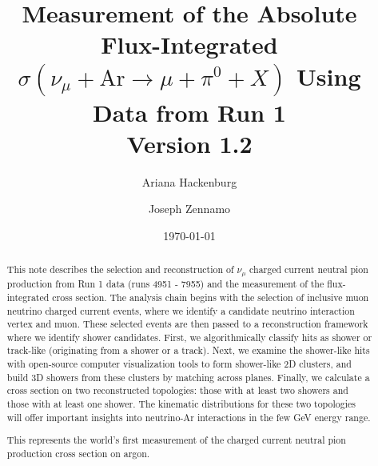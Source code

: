 \documentclass{article}
\title{\vspace{0.2in} Measurement of the Absolute Flux-Integrated $\sigma\left(\nu_{\mu}+\text{Ar} \rightarrow \mu + \pi^{0} + X\right)$ Using Data from Run 1 \\
{\bf Version 1.2}
}
\author[1]{Ariana Hackenburg}
\author[2]{Joseph Zennamo}
\affil[1]{Yale Univerity, New Haven, CT}
\affil[2]{University of Chicago, Chicago, IL}
\date{\today}
\begin{document}
\maketitle

\begin{abstract}
This note describes the selection and reconstruction of $\nu_{\mu}$ charged current neutral pion production from Run 1 data (runs 4951 - 7955) and the measurement of the flux-integrated cross section. The analysis chain begins with the selection of inclusive muon neutrino charged current events, where we identify a candidate neutrino interaction vertex and muon. These selected events are then passed to a reconstruction framework where we identify shower candidates.  First, we algorithmically classify hits as shower or track-like (originating from a shower or a track). Next, we examine the shower-like hits with open-source computer visualization tools to form shower-like 2D clusters, and build 3D showers from these clusters by matching across planes. Finally, we calculate a cross section on two reconstructed topologies: those with at least two showers and those with at least one shower.  The kinematic distributions for these two topologies will offer important insights into neutrino-Ar interactions in the few GeV energy range.

This represents the world's first measurement of the charged current neutral pion production cross section on argon. 

\end{abstract}

\pagestyle{fancy}%
\fancyhead[C]{}
\renewcommand{\headrulewidth}{0.4pt}%

\newpage
{}
\tableofcontents
\clearpage

\setcounter{tocdepth}{3} 

\clearpage
\renewcommand{\thepage}{\arabic{page}}
\setcounter{page}{1}

\newpage
\end{document}
